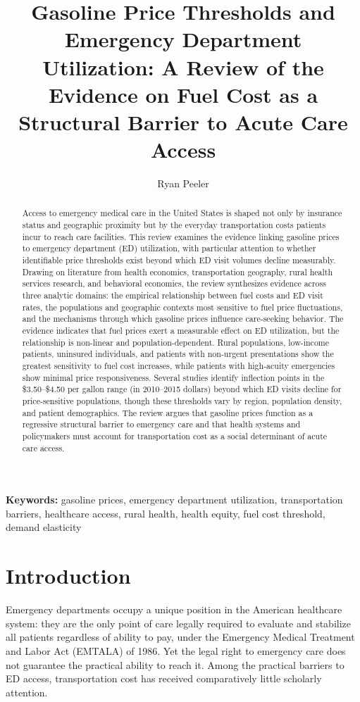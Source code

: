 \documentclass[12pt, a4paper]{article}
\title{Gasoline Price Thresholds and Emergency Department Utilization: A Review of the Evidence on Fuel Cost as a Structural Barrier to Acute Care Access}
\author{Ryan Peeler}
\date{}
\begin{document}
\maketitle

\begin{abstract}
Access to emergency medical care in the United States is shaped not only by insurance status and geographic proximity but by the everyday transportation costs patients incur to reach care facilities. This review examines the evidence linking gasoline prices to emergency department (ED) utilization, with particular attention to whether identifiable price thresholds exist beyond which ED visit volumes decline measurably. Drawing on literature from health economics, transportation geography, rural health services research, and behavioral economics, the review synthesizes evidence across three analytic domains: the empirical relationship between fuel costs and ED visit rates, the populations and geographic contexts most sensitive to fuel price fluctuations, and the mechanisms through which gasoline prices influence care-seeking behavior. The evidence indicates that fuel prices exert a measurable effect on ED utilization, but the relationship is non-linear and population-dependent. Rural populations, low-income patients, uninsured individuals, and patients with non-urgent presentations show the greatest sensitivity to fuel cost increases, while patients with high-acuity emergencies show minimal price responsiveness. Several studies identify inflection points in the \$3.50--\$4.50 per gallon range (in 2010--2015 dollars) beyond which ED visits decline for price-sensitive populations, though these thresholds vary by region, population density, and patient demographics. The review argues that gasoline prices function as a regressive structural barrier to emergency care and that health systems and policymakers must account for transportation cost as a social determinant of acute care access.
\end{abstract}

\noindent\textbf{Keywords:} gasoline prices, emergency department utilization, transportation barriers, healthcare access, rural health, health equity, fuel cost threshold, demand elasticity

\section{Introduction}

Emergency departments occupy a unique position in the American healthcare system: they are the only point of care legally required to evaluate and stabilize all patients regardless of ability to pay, under the Emergency Medical Treatment and Labor Act (EMTALA) of 1986. Yet the legal right to emergency care does not guarantee the practical ability to reach it. Among the practical barriers to ED access, transportation cost has received comparatively little scholarly attention.
\end{document}
